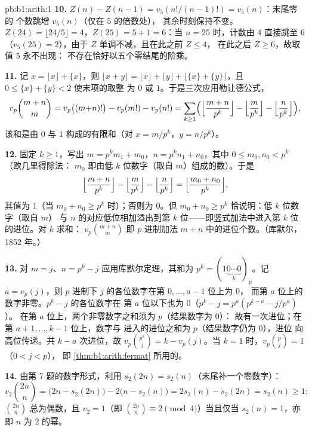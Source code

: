 \begin{solution}{pb:b1:arith:1}
\textbf{10.} $Z(n) - Z(n-1) = v_5(n!/(n-1)!) = v_5(n)$：末尾零的
个数跳增 $v_5(n)$（仅在 $5$ 的倍数处），
其余时刻保持不变。$Z(24) = \lfloor24/5\rfloor = 4$，$Z(25) =
5 + 1 = 6$：当 $n = 25$ 时，计数由 $4$ 直接跳至 $6$
（$v_5(25) = 2$），由于 $Z$ 单调不减，且在此之前 $Z \leq 4$，
在此之后 $Z \geq 6$，故取值 $5$ 永不出现：
不存在恰好以五个零结尾的阶乘。

\textbf{11.} 记 $x = \lfloor x\rfloor + \{x\}$，则 $\lfloor x +
y\rfloor = \lfloor x\rfloor + \lfloor y\rfloor + \lfloor \{x\} +
\{y\}\rfloor$，且 $0 \leq \{x\} + \{y\} < 2$ 使末项的取整
为 $0$ 或 $1$。于是三次应用勒让德公式，
\[
v_p\binom{m+n}m = v_p\bigl((m{+}n)!\bigr) - v_p(m!) - v_p(n!)
= \sum_{k\geq1}\Bigl(
\Bigl\lfloor\frac{m+n}{p^k}\Bigr\rfloor
- \Bigl\lfloor\frac{m}{p^k}\Bigr\rfloor
- \Bigl\lfloor\frac{n}{p^k}\Bigr\rfloor\Bigr),
\]
该和是由 $0$ 与 $1$ 构成的有限和（对 $x =
m/p^k$，$y = n/p^k$）。

\textbf{12.} 固定 $k \geq 1$，写出 $m = p^km_1 + m_0$，$n =
p^kn_1 + n_0$，其中 $0 \leq m_0, n_0 < p^k$（欧几里得除法：
$m_0$ 即由低 $k$ 位数字（取自 $m$）组成的数）。于是
\[
\Bigl\lfloor\frac{m+n}{p^k}\Bigr\rfloor
- \Bigl\lfloor\frac m{p^k}\Bigr\rfloor
- \Bigl\lfloor\frac n{p^k}\Bigr\rfloor
= \Bigl\lfloor\frac{m_0 + n_0}{p^k}\Bigr\rfloor ,
\]
其值为 $1$（当 $m_0 + n_0 \geq p^k$ 时）；否则为 $0$。但 $m_0 +
n_0 \geq p^k$ 恰说明：低 $k$ 位数字（取自 $m$）
与 $n$ 的对应低位相加溢出到第 $k$ 位——即竖式加法中进入第 $k$ 位
的进位。对 $k$ 求和：
$v_p\binom{m+n}m$ 即 $p$ 进制加法
$m + n$ 中的进位个数。（库默尔，1852 年。）

\textbf{13.} 对 $m = j$、$n = p^k - j$ 应用库默尔定理，其和为 $p^k =
(1\underbrace{0\cdots0}_{k})_p$。记 $a = v_p(j)$，则 $p$ 进制下
$j$ 的各位数字在第 $0, \dots, a-1$ 位上为 $0$，
而第 $a$ 位上的数字非零。$p^k - j$ 的各位数字在
第 $a$ 位以下也为 $0$（$p^k - j = p^a(p^{k-a} - j/p^a)$）。
在第 $a$ 位上，两个非零数字之和须为 $p$（结果数字为 $0$）：
故有一次进位；在第 $a+1, \dots, k-1$ 位上，数字与
进入的进位之和为 $p$（结果数字仍为 $0$），进位
向高位传递。共 $k - a$ 次进位，故 $v_p\binom{p^k}j = k -
v_p(j)$。当 $k = 1$ 时，$v_p\binom pj = 1$（$0 < j < p$），
即 \cref{thm:b1:arith:fermat} 所用的。

\textbf{14.} 由第 7 题的数字形式，利用 $s_2(2n) =
s_2(n)$（末尾补一个零数字）：
\[
v_2\binom{2n}n = \bigl(2n - s_2(2n)\bigr) - 2\bigl(n -
s_2(n)\bigr) = 2s_2(n) - s_2(2n) = s_2(n) \geq 1 :
\]
$\binom{2n}n$ 总为偶数，且 $v_2 = 1$（即 $\binom{2n}n
\equiv 2 \pmod 4$）当且仅当 $s_2(n) = 1$，亦即 $n$ 为
$2$ 的幂。


\end{solution}
